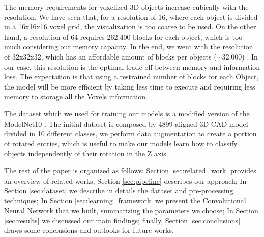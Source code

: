The memory requirements for voxelized 3D objects increase cubically with the resolution. We have seen that, for a resolution of 16, where each object is divided in a 16x16x16 voxel grid, the visualization is too coarse to be used. On the other hand, a resolution of 64 requires 262.400 blocks for each object, which is too much considering our memory capacity. In the end, we went with the resolution of 32x32x32, which has an affordable amount of blocks per objects ($\sim$32.000) \cite{liu2019pointvoxel}. In our case, this resolution is the optimal trade-off between memory and information loss. The expectation is that using a restrained number of blocks for each Object, the model will be more efficient by taking less time to execute and requiring less memory to storage all the Voxels information. 

The dataset which we used for training our models is a modified version of the ModelNet10 \cite{7298801}. The initial dataset is composed by 4899 aligned 3D CAD model divided in 10 different classes, we perform data augmentation to create a portion of rotated entries, which is useful to make our models learn how to classify objects independently of their rotation in the Z axis. 

The rest of the paper is organized as follows: Section \ref{sec:related_work} provides an overview of related works; Section \ref{sec:pipeline} describes our approach; In Section \ref{sec:dataset} we describe in details the dataset and pre-processing techniques; In Section \ref{sec:learning_framework} we present the Convolutional Neural Network that we built, summarizing the parameters we choose; In Section \ref{sec:results} we discussed our main findings; finally, Section \ref{sec:conclusions} draws some conclusions and outlooks for future works.\\
